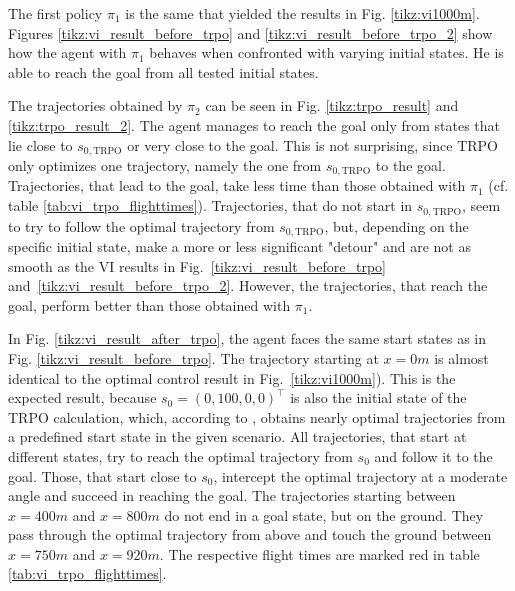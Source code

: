 The first policy $\pi_1$ is the same that yielded the results in Fig. \ref{tikz:vi1000m}. Figures \ref{tikz:vi_result_before_trpo} and \ref{tikz:vi_result_before_trpo_2} show how the agent with $\pi_1$ behaves when confronted with varying initial states. He is able to reach the goal from all tested initial states.

The trajectories obtained by $\pi_2$ can be seen in Fig. \ref{tikz:trpo_result} and \ref{tikz:trpo_result_2}. The agent manages to reach the goal only from states that lie close to $s_{0,\text{TRPO}}$ or very close to the goal. This is not surprising, since TRPO only optimizes one trajectory, namely the one from $s_{0,\text{TRPO}}$ to the goal. Trajectories, that lead to the goal, take less time than those obtained with $\pi_1$ (cf. table \ref{tab:vi_trpo_flighttimes}). Trajectories, that do not start in $s_{0,\text{TRPO}}$, seem to try to follow the optimal trajectory from $s_{0,\text{TRPO}}$, but, depending on the specific initial state, make a more or less significant "detour" and are not as smooth as the VI results in Fig.~\ref{tikz:vi_result_before_trpo} and~\ref{tikz:vi_result_before_trpo_2}. However, the trajectories, that reach the goal, perform better than those obtained with $\pi_1$.

In Fig. \ref{tikz:vi_result_after_trpo}, the agent faces the same start states as in Fig. \ref{tikz:vi_result_before_trpo}. The trajectory starting at $x=0m$ is almost identical to the optimal control result in Fig.~\ref{tikz:vi1000m}). This is the expected result, because $s_0 = (0,100,0,0)^\top$ is also the initial state of the TRPO calculation, which, according to \cite{Zuern2017}, obtains nearly optimal trajectories from a predefined start state in the given scenario. All trajectories, that start at different states, try to reach the optimal trajectory from $s_0$ and follow it to the goal. Those, that start close to $s_0$, intercept the optimal trajectory at a moderate angle and succeed in reaching the goal. The trajectories starting between $x=400m$ and $x=800m$ do not end in a goal state, but on the ground. They pass through the optimal trajectory from above and touch the ground between $x=750m$ and $x=920m$. The respective flight times are marked red in table \ref{tab:vi_trpo_flighttimes}.

